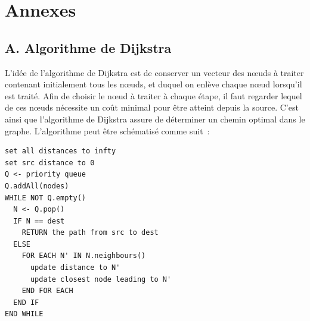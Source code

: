 \documentclass[11pt,journal,compsoc]{IEEEtran}
\begin{document}

\section*{Annexes}
  \subsection*{A. Algorithme de Dijkstra}
    L'idée de l'algorithme de Dijkstra est de conserver un vecteur des nœuds à traiter contenant initialement tous les nœuds, et duquel on enlève chaque nœud
    lorsqu'il est traité. Afin de choisir le nœud à traiter à chaque étape, il faut regarder lequel de ces nœuds nécessite un coût minimal pour être atteint
    depuis la source. C'est ainsi que l'algorithme de Dijkstra assure de déterminer un chemin optimal dans le graphe. L'algorithme peut être schématisé comme suit~:

\begin{verbatim}
set all distances to infty
set src distance to 0
Q <- priority queue
Q.addAll(nodes)
WHILE NOT Q.empty()
  N <- Q.pop()
  IF N == dest
    RETURN the path from src to dest
  ELSE
    FOR EACH N' IN N.neighbours()
      update distance to N'
      update closest node leading to N'
    END FOR EACH
  END IF
END WHILE
\end{verbatim}
\end{document}
